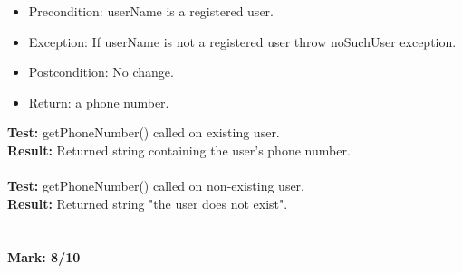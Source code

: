 \documentclass[12pt]{article}
\begin{document}
	\begin{itemize}
		\item Precondition: userName is a registered user.
		\item Exception: If userName is not a registered user throw noSuchUser exception.
		\item Postcondition: No change.
		\item Return: a phone number.
	\end{itemize}
		
	\noindent \textbf{Test:} getPhoneNumber() called on existing user.\\
	\textbf{Result:} Returned string containing the user's phone number.\\\\
	\textbf{Test:} getPhoneNumber() called on non-existing user.\\
	\textbf{Result:} Returned string "the user does not exist".\\
	\\ \\ 
	\textbf{Mark: 8/10}
	
%	
%	
%	
%	
%	
\end{document}
